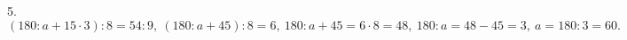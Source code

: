 5. $(180:a+15\cdot3):8=54:9,\ (180:a+45):8=6,\ 180:a+45=6\cdot8=48,\ 180:a=48-45=3,\ a=180:3=60.$\\
